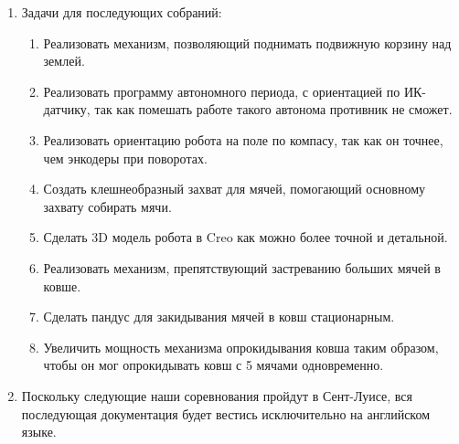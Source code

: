 \begin{enumerate}
\begin{enumerate}
	\end{enumerate}
	
	\item Задачи для последующих собраний:
	\begin{enumerate}
		\item Реализовать механизм, позволяющий поднимать подвижную корзину над землей.
		
		\item Реализовать программу автономного периода, с ориентацией по ИК-датчику, так как помешать работе такого автонома противник не сможет.
		
		\item Реализовать ориентацию робота на поле по компасу, так как он точнее, чем энкодеры при поворотах.
		
		\item Создать клешнеобразный захват для мячей, помогающий основному захвату собирать мячи.
		
		\item Сделать 3D модель робота в Creo как можно более точной и детальной.
		
		\item Реализовать механизм, препятствующий застреванию больших мячей в ковше.
			
		\item Сделать пандус для закидывания мячей в ковш стационарным.
		
		\item Увеличить мощность механизма опрокидывания ковша таким образом, чтобы он мог опрокидывать ковш с 5 мячами одновременно.
		
	\end{enumerate}
	
	\item Поскольку следующие наши соревнования пройдут в Сент-Луисе, вся последующая документация будет вестись исключительно на английском языке.
	
\end{enumerate}
\fillpage